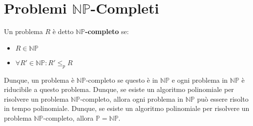\section{Problemi \texorpdfstring{$\mathbb{NP}$}{NP}-Completi}
    \begin{definition}
        Un problema $R$ è detto \textbf{$\mathbb{NP}$-completo} se:
        \begin{itemize}
            \item $R\in\mathbb{NP}$
            \item $\forall R'\in\mathbb{NP}: R'\leq_p R$
        \end{itemize}
    \end{definition}
    Dunque, un problema è $\mathbb{NP}$-completo se questo è in $\mathbb{NP}$ e ogni problema in $\mathbb{NP}$ è riducibile a questo problema. Dunque, se esiste un algoritmo polinomiale per risolvere un problema $\mathbb{NP}$-completo, allora ogni problema in $\mathbb{NP}$ può essere risolto in tempo polinomiale. Dunque, se esiste un algoritmo polinomiale per risolvere un problema $\mathbb{NP}$-completo, allora $\mathbb{P}=\mathbb{NP}$.
